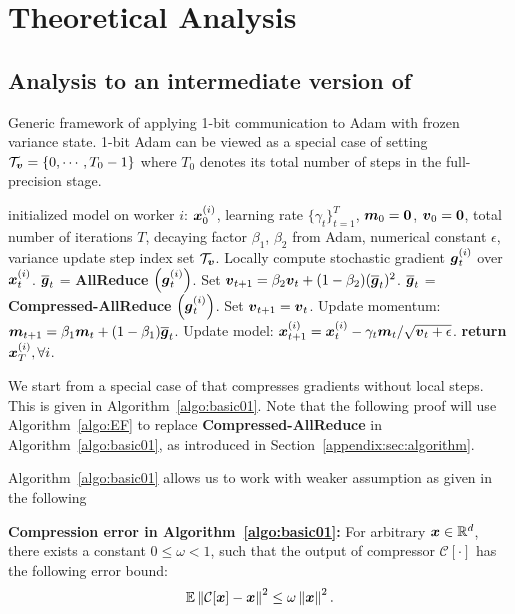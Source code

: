 \section{Theoretical Analysis}
\label{appendix:sec:proof}
\subsection{Analysis to an intermediate version of {\myalgo}}
\begin{algorithm}[ht!]
\small
	\caption{Generic framework of applying 1-bit communication to Adam with frozen variance state. 1-bit Adam can be viewed as a special case of setting $\mathcal{T}_{\boldsymbol{v}}=\{0,\cdots,T_0-1\}$ where $T_0$ denotes its total number of steps in the full-precision stage.}\label{algo:basic01}
	\begin{algorithmic}[1]
		\Require initialized model on worker $i$: $\boldsymbol{x}_{0}^{(i)}$, learning rate $\{\gamma_t\}_{t=1}^{T}$, $\boldsymbol{m}_0=\boldsymbol{0}$, $\boldsymbol{v}_0=\boldsymbol{0}$, total number of iterations $T$, decaying factor $\beta_1$, $\beta_2$ from Adam, numerical constant $\epsilon$, variance update step index set $\mathcal{T}_{\boldsymbol{v}}$.
		    \State Locally compute stochastic gradient $\boldsymbol{g}^{(i)}_t$ over $\boldsymbol{x}_{t}^{(i)}$.
		        \State $\overline{\boldsymbol{g}}_t$ = \textbf{AllReduce} $\left(\boldsymbol{g}_t^{(i)}\right)$.
		        \State Set $\boldsymbol{v}_{t+1} = \beta_2\boldsymbol{v}_{t} + (1-\beta_2)(\overline{\boldsymbol{g}}_t)^2$.
		    \Else
		        \State $\overline{\boldsymbol{g}}_t$ = \textbf{Compressed-AllReduce} $\left(\boldsymbol{g}_t^{(i)}\right)$.
		        \State Set $\boldsymbol{v}_{t+1} = \boldsymbol{v}_{t}$.
		    \EndIf
		    \State Update momentum: $\boldsymbol{m}_{t+1} = \beta_1\boldsymbol{m}_{t} + (1-\beta_1)\overline{\boldsymbol{g}}_{t}$.
		    \State Update model: $\boldsymbol{x}_{t+1}^{(i)} = \boldsymbol{x}_{t}^{(i)} - \gamma_t\boldsymbol{m}_{t}/\sqrt{\boldsymbol{v}_{t}+\epsilon}$.
		\EndFor
		\State \textbf{return} $\boldsymbol{x}_T^{(i)}, \forall i$.
	\end{algorithmic}
\end{algorithm}
We start from a special case of {\myalgo} that compresses gradients without local steps. This is given in Algorithm~\ref{algo:basic01}.
Note that the following proof will use Algorithm~\ref{algo:EF} to replace \textbf{Compressed-AllReduce} in Algorithm~\ref{algo:basic01}, as introduced in Section~\ref{appendix:sec:algorithm}.

Algorithm~\ref{algo:basic01} allows us to work with weaker assumption as given in the following
\begin{assumption}
\label{assume:compression}
\textbf{Compression error in Algorithm~\ref{algo:basic01}:}
    For arbitrary $\boldsymbol{x}\in\mathbb{R}^d$, there exists a constant $0\leq \omega < 1$, such that the output of compressor $\mathcal{C}[\cdot]$ has the following error bound:
    \begin{align*}
        \mathbb{E}\left\| \mathcal{C}[\boldsymbol{x}] - \boldsymbol{x} \right\|^2 \leq \omega \left\| \boldsymbol{x}\right\|^2.
    \end{align*}
\end{assumption}

